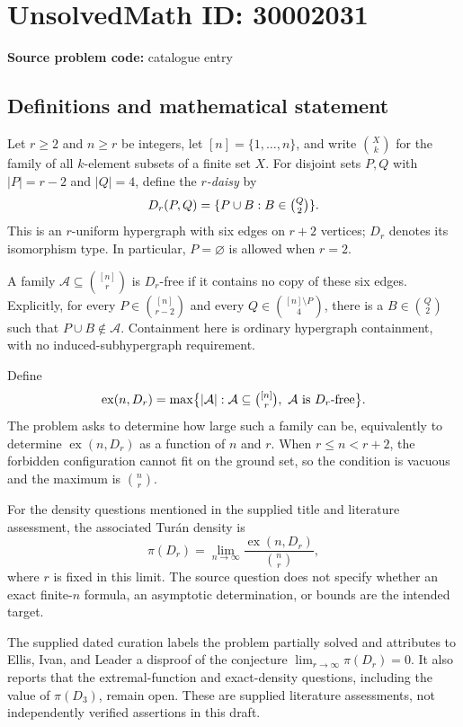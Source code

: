 \documentclass[11pt]{article}
\begin{document}
\section*{UnsolvedMath ID: 30002031}
\textbf{Source problem code:} catalogue entry
\subsection{Definitions and mathematical statement}
Let \(r\ge 2\) and \(n\ge r\) be integers, let \([n]=\{1,\ldots,n\}\), and write \(\binom{X}{k}\) for the family of all \(k\)-element subsets of a finite set \(X\). For disjoint sets \(P,Q\) with \(|P|=r-2\) and \(|Q|=4\), define the \emph{\(r\)-daisy} by
\[
D_r(P,Q)=\{P\cup B:B\in\tbinom{Q}{2}\}.
\]
This is an \(r\)-uniform hypergraph with six edges on \(r+2\) vertices; \(D_r\) denotes its isomorphism type. In particular, \(P=\varnothing\) is allowed when \(r=2\).

A family \(\mathcal A\subseteq\binom{[n]}{r}\) is \(D_r\)-free if it contains no copy of these six edges. Explicitly, for every \(P\in\binom{[n]}{r-2}\) and every \(Q\in\binom{[n]\setminus P}{4}\), there is a \(B\in\binom{Q}{2}\) such that \(P\cup B\notin\mathcal A\). Containment here is ordinary hypergraph containment, with no induced-subhypergraph requirement.

Define
\[
\operatorname{ex}(n,D_r)=\max\bigl\{|\mathcal A|:\mathcal A\subseteq\tbinom{[n]}{r},\ \mathcal A\text{ is }D_r\text{-free}\bigr\}.
\]
The problem asks to determine how large such a family can be, equivalently to determine \(\operatorname{ex}(n,D_r)\) as a function of \(n\) and \(r\). When \(r\le n<r+2\), the forbidden configuration cannot fit on the ground set, so the condition is vacuous and the maximum is \(\binom nr\).

For the density questions mentioned in the supplied title and literature assessment, the associated Turán density is
\[
\pi(D_r)=\lim_{n\to\infty}\frac{\operatorname{ex}(n,D_r)}{\binom nr},
\]
where \(r\) is fixed in this limit. The source question does not specify whether an exact finite-\(n\) formula, an asymptotic determination, or bounds are the intended target.

The supplied dated curation labels the problem partially solved and attributes to Ellis, Ivan, and Leader a disproof of the conjecture \(\lim_{r\to\infty}\pi(D_r)=0\). It also reports that the extremal-function and exact-density questions, including the value of \(\pi(D_3)\), remain open. These are supplied literature assessments, not independently verified assertions in this draft.
\end{document}
